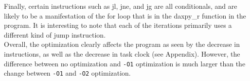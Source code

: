 \documentclass[twocolumn]{article}
\newcommand{\cc}[1]{\texttt{#1}}
\begin{document}
Finally, certain instructions such as jl, jne, and jg are all conditionals, and are likely to be a manifestation of the for loop that is in the daxpy\_r function in the program. It is interesting to note that each of the iterations primarily uses a different kind of jump instruction. \\

Overall, the optimization clearly affects the program as seen by the decrease in instructions, as well as the decrease in task clock (see Appendix). However, the difference between no optimization and \cc{-O1} optimization is much larger than the change between \cc{-O1} and \cc{-O2} optimization. 





\printbibliography
\newpage
\onecolumn
\end{document}
